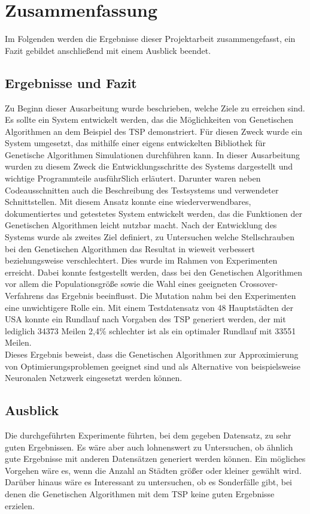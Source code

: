 
\section{Zusammenfassung}
Im Folgenden werden die Ergebnisse dieser Projektarbeit zusammengefasst, ein Fazit gebildet anschließend mit einem Ausblick beendet.

\subsection{Ergebnisse und Fazit}
Zu Beginn dieser Ausarbeitung wurde beschrieben, welche Ziele zu erreichen sind. Es sollte ein System entwickelt werden, das die Möglichkeiten von Genetischen Algorithmen an dem Beispiel des TSP demonstriert. Für diesen Zweck wurde ein System umgesetzt, das mithilfe einer eigens entwickelten Bibliothek für Genetische Algorithmen Simulationen durchführen kann. In dieser Ausarbeitung wurden zu diesem Zweck die Entwicklungsschritte des Systems dargestellt und wichtige Programmteile ausführSlich erläutert. Darunter waren neben Codeausschnitten auch die Beschreibung des Testsystems und verwendeter Schnittstellen. 
Mit diesem Ansatz konnte eine wiederverwendbares, dokumentiertes und getestetes System entwickelt werden, das die Funktionen der Genetischen Algorithmen leicht nutzbar macht. 
Nach der Entwicklung des Systems wurde als zweites Ziel definiert, zu Untersuchen welche Stellschrauben bei den Genetischen Algorithmen das Resultat in wieweit verbessert beziehungsweise verschlechtert. Dies wurde im Rahmen von Experimenten erreicht. Dabei konnte festgestellt werden, dass bei den Genetischen Algorithmen vor allem die Populationsgröße sowie die Wahl eines geeigneten Crossover-Verfahrens das Ergebnis beeinflusst. Die Mutation nahm bei den Experimenten eine unwichtigere Rolle ein. Mit einem Testdatensatz von 48 Hauptstädten der USA konnte ein Rundlauf nach Vorgaben des TSP generiert werden, der mit lediglich 34373 Meilen 2,4\% schlechter ist als ein optimaler Rundlauf mit 33551 Meilen. \\
Dieses Ergebnis beweist, dass die Genetischen Algorithmen zur Approximierung von Optimierungsproblemen geeignet sind und als Alternative von beispielsweise Neuronalen Netzwerk eingesetzt werden können.
\subsection{Ausblick}
Die durchgeführten Experimente führten, bei dem gegeben Datensatz, zu sehr guten Ergebnissen. Es wäre aber auch lohnenswert zu Untersuchen, ob ähnlich gute Ergebnisse mit anderen Datensätzen generiert werden können. Ein mögliches Vorgehen wäre es, wenn die Anzahl an Städten größer oder kleiner gewählt wird.
Darüber hinaus wäre es Interessant zu untersuchen, ob es Sonderfälle gibt, bei denen die Genetischen Algorithmen mit dem TSP keine guten Ergebnisse erzielen.
